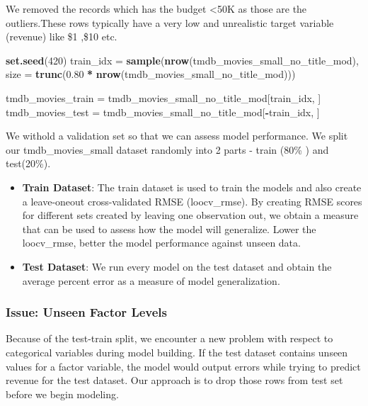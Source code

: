 \documentclass[
]{article}
\newenvironment{Shaded}{\begin{snugshade}}{\end{snugshade}}
\newcommand{\DataTypeTok}[1]{\textcolor[rgb]{0.13,0.29,0.53}{#1}}
\newcommand{\DecValTok}[1]{\textcolor[rgb]{0.00,0.00,0.81}{#1}}
\newcommand{\FloatTok}[1]{\textcolor[rgb]{0.00,0.00,0.81}{#1}}
\newcommand{\KeywordTok}[1]{\textcolor[rgb]{0.13,0.29,0.53}{\textbf{#1}}}
\newcommand{\NormalTok}[1]{#1}
\newcommand{\OperatorTok}[1]{\textcolor[rgb]{0.81,0.36,0.00}{\textbf{#1}}}
\newcommand{\StringTok}[1]{\textcolor[rgb]{0.31,0.60,0.02}{#1}}
\begin{document}
We removed the records which has the budget \textless50K as those are
the outliers.These rows typically have a very low and unrealistic target
variable (revenue) like \$1 ,\$10 etc.

\begin{Shaded}
\begin{Highlighting}[]
\KeywordTok{set.seed}\NormalTok{(}\DecValTok{420}\NormalTok{)}
\NormalTok{train_idx  =}\StringTok{ }\KeywordTok{sample}\NormalTok{(}\KeywordTok{nrow}\NormalTok{(tmdb_movies_small_no_title_mod), }\DataTypeTok{size =} \KeywordTok{trunc}\NormalTok{(}\FloatTok{0.80} \OperatorTok{*}\StringTok{ }\KeywordTok{nrow}\NormalTok{(tmdb_movies_small_no_title_mod)))}

\NormalTok{tmdb_movies_train =}\StringTok{ }\NormalTok{tmdb_movies_small_no_title_mod[train_idx, ]}
\NormalTok{tmdb_movies_test =}\StringTok{ }\NormalTok{tmdb_movies_small_no_title_mod[}\OperatorTok{-}\NormalTok{train_idx, ]}
\end{Highlighting}
\end{Shaded}

We withold a validation set so that we can assess model performance. We
split our tmdb\_movies\_small dataset randomly into 2 parts - train
(80\% ) and test(20\%).

\begin{itemize}
\item
  \textbf{Train Dataset}: The train dataset is used to train the models
  and also create a leave-oneout cross-validated RMSE (loocv\_rmse). By
  creating RMSE scores for different sets created by leaving one
  observation out, we obtain a measure that can be used to assess how
  the model will generalize. Lower the loocv\_rmse, better the model
  performance against unseen data.
\item
  \textbf{Test Dataset}: We run every model on the test dataset and
  obtain the average percent error as a measure of model generalization.
\end{itemize}

\hypertarget{issue-unseen-factor-levels}{%
\subsubsection{Issue: Unseen Factor
Levels}\label{issue-unseen-factor-levels}}

Because of the test-train split, we encounter a new problem with respect
to categorical variables during model building. If the test dataset
contains unseen values for a factor variable, the model would output
errors while trying to predict revenue for the test dataset. Our
approach is to drop those rows from test set before we begin modeling.
\end{document}
